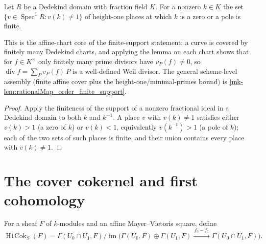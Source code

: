 \begin{lemma}
  \label{mk-thm:adelic_finite_support_order}
  \leanok

  Let \(R\) be a Dedekind domain with fraction field \(K\). For a nonzero
  \(k \in K\) the set \(\{ v \in \operatorname{Spec}^1 R : v(k) \ne 1\}\) of
  height-one places at which \(k\) is a zero or a pole is finite.

  This is the affine-chart core of the finite-support statement: a curve is
  covered by finitely many Dedekind charts, and applying the lemma on each
  chart shows that for \(f \in K^\times\) only finitely many prime divisors
  have \(v_P(f) \ne 0\), so \(\operatorname{div} f = \sum_P v_P(f)\,P\) is a
  well-defined Weil divisor. The general scheme-level assembly (finite affine
  cover plus the height-one/minimal-primes bound) is
  \ref{mk-lem:rationalMap_order_finite_support}.
\end{lemma}
\begin{proof}
  \leanok
  Apply the finiteness of the support of a nonzero fractional ideal in a
  Dedekind domain to both \(k\) and \(k^{-1}\). A place \(v\) with
  \(v(k) \ne 1\) satisfies either \(v(k) > 1\) (a zero of \(k\)) or
  \(v(k) < 1\), equivalently \(v(k^{-1}) > 1\) (a pole of \(k\)); each of
  the two sets of such places is finite, and their union contains every
  place with \(v(k) \ne 1\).
\end{proof}

\section{The cover cokernel and first cohomology}
\label{mk-sec:RiemannRoch_Adelic_cokernel}

\begin{definition}
  \label{mk-def:adelic_coverH1}
  \leanok

  For a sheaf \(F\) of \(k\)-modules and an affine Mayer--Vietoris square,
  define
  \[
    \operatorname{H1Cok}_S(F)
      =\Gamma(U_0\cap U_1,F)/
        \operatorname{im}\bigl(\Gamma(U_0,F)\oplus\Gamma(U_1,F)
          \xrightarrow{\,f_0-f_1\,}\Gamma(U_0\cap U_1,F)\bigr).
  \]
\end{definition}

